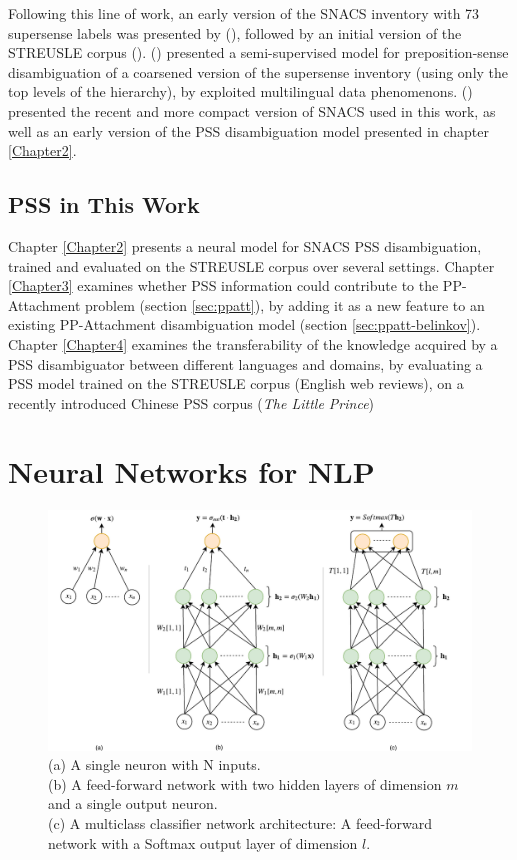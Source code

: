 Following this line of work, an early version of the SNACS inventory with 73 supersense labels was presented by (\cite{schneider-15}), followed by an initial version of the STREUSLE corpus (\cite{schneider-16}). (\cite{gonen-16}) presented a semi-supervised model for preposition-sense disambiguation of a coarsened version of the supersense inventory (using only the top levels of the hierarchy), by exploited multilingual data phenomenons. (\cite{snacs}) presented the recent and more compact version of SNACS used in this work, as well as an early version of the PSS disambiguation model presented in chapter \ref{Chapter2}.

\subsection{PSS in This Work}

Chapter \ref{Chapter2} presents a neural model for SNACS PSS disambiguation, trained and evaluated on the STREUSLE corpus over several settings. Chapter \ref{Chapter3} examines whether PSS information could contribute to the PP-Attachment problem (section \ref{sec:ppatt}), by adding it as a new feature to an existing PP-Attachment disambiguation model (section \ref{sec:ppatt-belinkov}). Chapter \ref{Chapter4} examines the transferability of the knowledge acquired by a PSS disambiguator between different languages and domains, by evaluating a PSS model trained on the STREUSLE corpus (English web reviews), on a recently introduced Chinese PSS corpus (\textit{The Little Prince})

\pagebreak

\section{Neural Networks for NLP}

\begin{figure}[htbp]
  \centering
    \includegraphics[width=1\textwidth]{Figures/neurons.pdf}
  \caption{ 
    (a) A single neuron with N inputs. \\
    (b) A feed-forward network with two hidden layers of dimension $m$ and a single output neuron. \\
    (c) A multiclass classifier network architecture: A feed-forward network with a Softmax output layer of dimension $l$.}
  \label{fig:networks}
\end{figure}


